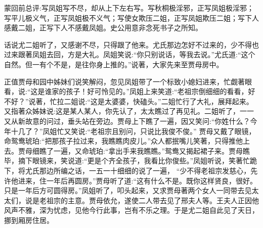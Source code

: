 

\begin{parag}
    \begin{note}蒙回前总评:写凤姐写不尽，却从上下左右写。写秋桐极淫邪，正写凤姐极淫邪；写平儿极义气，正写凤姐极不义气；写使女欺压二姐，正写凤姐欺压二姐；写下人感戴二姐，正写下人不感戴凤姐。史公用意非念死书子之所知。\end{note}
\end{parag}


\begin{parag}
    话说尤二姐听了，又感谢不尽，只得跟了他来。尤氏那边怎好不过来的，少不得也过来跟著凤姐去回，方是大礼。凤姐笑说:“你只别说话，等我去说。”尤氏道:“这个自然。但一有个不是，是往你身上推的。”说著，大家先来至贾母房中。
\end{parag}


\begin{parag}
    正值贾母和园中姊妹们说笑解闷，忽见凤姐带了一个标致小媳妇进来，忙觑著眼看，说:“这是谁家的孩子！好可怜见的。”凤姐上来笑道:“老祖宗倒细细的看看，好不好？”说著，忙拉二姐说:“这是太婆婆，快磕头。”二姐忙行了大礼，展拜起来。又指著众姊妹说:这是某人某人，你先认了，太太瞧过了再见礼。二姐听了，一一又从新故意的问过，垂头站在旁边。贾母上下瞧了一遍，因又笑问:“你姓什么？今年十几了？”凤姐忙又笑说:“老祖宗且别问，只说比我俊不俊。” 贾母又戴了眼镜，命鸳鸯琥珀:“把那孩子拉过来，我瞧瞧肉皮儿。”众人都抿嘴儿笑著，只得推他上去。贾母细瞧了一遍，又命琥珀:“拿出手来我瞧瞧。”鸳鸯又揭起裙子来。贾母瞧毕，摘下眼镜来，笑说道:“更是个齐全孩子，我看比你俊些。”凤姐听说，笑著忙跪下，将尤氏那边所编之话，一五一十细细的说了一遍， “少不得老祖宗发慈心，先许他进来，住一年后再圆房。”贾母听了道:“这有什么不是。既你这样贤良，很好。只是一年后方可圆得房。”凤姐听了，叩头起来，又求贾母著两个女人一同带去见太太们，说是老祖宗的主意。贾母依允，遂使二人带去见了邢夫人等。王夫人正因他风声不雅，深为忧虑，见他今行此事，岂有不乐之理。于是尤二姐自此见了天日，挪到厢房住居。
\end{parag}


